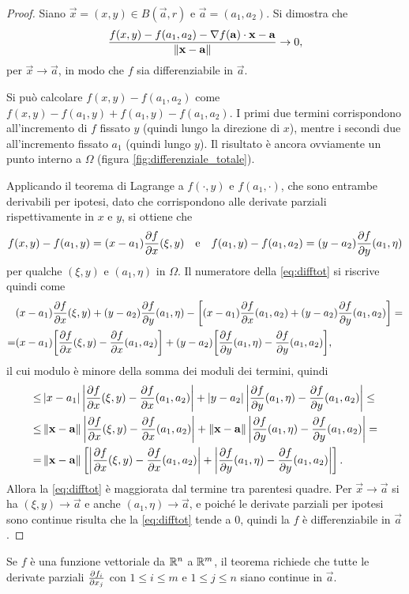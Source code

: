 \begin{proof}
	Siano $\vec x=(x,y)\in B(\vec a,r)$ e $\vec a=(a_1,a_2)$.
	Si dimostra che
	\begin{equation} \label{eq:difftot}
		\frac{f(x,y)-f(a_1,a_2)-{\nabla f(\mathbf{a})}\cdot{\mathbf{x}-\mathbf{a}}}{\left\|{\mathbf{x}-\mathbf{a}}\right\|}\to 0,
	\end{equation}
	per $\vec x\to\vec a$, in modo che $f$ sia differenziabile in $\vec a$.

	Si può calcolare $f(x,y)-f(a_1,a_2)$ come $f(x,y)-f(a_1,y)+f(a_1,y)-f(a_1,a_2)$.
	I primi due termini corrispondono all'incremento di $f$ fissato $y$ (quindi lungo la direzione di $x$), mentre i secondi due all'incremento fissato $a_1$ (quindi lungo $y$).
	Il risultato è ancora ovviamente un punto interno a $\Omega$ (figura \ref{fig:differenziale_totale}).
	
	Applicando il teorema di Lagrange a $f(\cdot,y)$ e $f(a_1,\cdot)$, che sono entrambe derivabili per ipotesi, dato che corrispondono alle derivate parziali rispettivamente in $x$ e $y$, si ottiene che
	\begin{equation}
		f(x,y)-f(a_1,y)=(x-a_1)\frac{\partial {f}}{\partial {x}}(\xi,y)\quad\text{e}\quad f(a_1,y)-f(a_1,a_2)=(y-a_2)\frac{\partial {f}}{\partial {y}}(a_1,\eta)
	\end{equation}
	per qualche $(\xi,y)$ e $(a_1,\eta)$ in $\Omega$.
	Il numeratore della \eqref{eq:difftot} si riscrive quindi come
	\begin{align*}
		&(x-a_1)\frac{\partial {f}}{\partial {x}}(\xi,y)+(y-a_2)\frac{\partial {f}}{\partial {y}}(a_1,\eta)-\bigg[(x-a_1)\frac{\partial {f}}{\partial {x}}(a_1,a_2)+(y-a_2)\frac{\partial {f}}{\partial {y}}(a_1,a_2)\bigg]=\\
		=&(x-a_1)\bigg[\frac{\partial {f}}{\partial {x}}(\xi,y)-\frac{\partial {f}}{\partial {x}}(a_1,a_2)\bigg]+(y-a_2)\bigg[\frac{\partial {f}}{\partial {y}}(a_1,\eta)-\frac{\partial {f}}{\partial {y}}(a_1,a_2)\bigg],
	\end{align*}
	il cui modulo è minore della somma dei moduli dei termini, quindi
	\begin{align*}
		\leq&\left|{x-a_1}\right|\left|{\frac{\partial {f}}{\partial {x}}(\xi,y)-\frac{\partial {f}}{\partial {x}}(a_1,a_2)}\right|+\left|{y-a_2}\right|\left|{\frac{\partial {f}}{\partial {y}}(a_1,\eta)-\frac{\partial {f}}{\partial {y}}(a_1,a_2)}\right|\leq\\
		\leq&\left\|{\mathbf{x}-\mathbf{a}}\right\|\left|{\frac{\partial {f}}{\partial {x}}(\xi,y)-\frac{\partial {f}}{\partial {x}}(a_1,a_2)}\right|+\left\|{\mathbf{x}-\mathbf{a}}\right\|\left|{\frac{\partial {f}}{\partial {y}}(a_1,\eta)-\frac{\partial {f}}{\partial {y}}(a_1,a_2)}\right|=\\
		=&\left\|{\mathbf{x}-\mathbf{a}}\right\|\left[\left|{\frac{\partial {f}}{\partial {x}}(\xi,y)-\frac{\partial {f}}{\partial {x}}(a_1,a_2)}\right|+\left|{\frac{\partial {f}}{\partial {y}}(a_1,\eta)-\frac{\partial {f}}{\partial {y}}(a_1,a_2)}\right|\right].
	\end{align*}
	Allora la \eqref{eq:difftot} è maggiorata dal termine tra parentesi quadre.
	Per $\vec x\to\vec a$ si ha $(\xi,y)\to\vec a$ e anche $(a_1,\eta)\to\vec a$, e poiché le derivate parziali per ipotesi sono continue risulta che la \eqref{eq:difftot} tende a 0, quindi la $f$ è differenziabile in $\vec a$.
\end{proof}
Se $f$ è una funzione vettoriale da $\mathbb{R}^n$ a $\mathbb{R}^m$, il teorema richiede che tutte le derivate parziali $\frac{\partial f_i}{\partial x_j}$ con $1\leq i\leq m$ e $1\leq j\leq n$ siano continue in $\vec a$.

